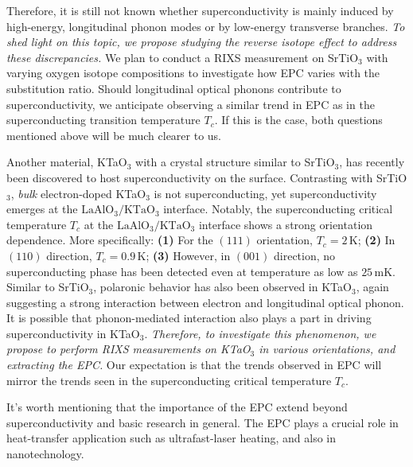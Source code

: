 \documentclass[11pt]{article}
\begin{document}
Therefore, it is still not known whether superconductivity is mainly induced by high-energy, longitudinal phonon modes or by low-energy transverse branches.
\textit{To shed light on this topic, we propose studying the reverse isotope effect to address these discrepancies.} We plan to conduct a RIXS measurement on SrTiO$_{3}$ with varying oxygen isotope compositions to investigate how EPC varies with the substitution ratio.  Should longitudinal optical phonons contribute to superconductivity, we anticipate observing a similar trend in EPC as in the superconducting transition temperature $T_{c}$. If this is the case, both questions mentioned above will be much clearer to us. 

Another material, KTaO$_{3}$ with a crystal structure similar to SrTiO$_{3}$, has recently been discovered to host superconductivity on the surface\cite{ren_two-dimensional_2022}. 
Contrasting with SrTiO$_{3}$, \textit{bulk}  electron-doped KTaO$_{3}$ is not superconducting, yet superconductivity emerges at the $\mathrm{LaAlO_{3}/KTaO_{3}}$ interface\cite{ren_two-dimensional_2022,chen_two-dimensional_2021}. 
Notably, the superconducting critical temperature $T_c$ at the $\mathrm{LaAlO_{3}/KTaO_{3}}$ interface shows a strong orientation dependence\cite{ren_two-dimensional_2022,chen_two-dimensional_2021}. 
More specifically: 
\textbf{(1)} For the $(111)$ orientation, $T_{c} = 2\,\mathrm{K}$\cite{ren_two-dimensional_2022};
\textbf{(2)} In $(110)$ direction, $T_{c} = 0.9\,\mathrm{K}$\cite{chen_two-dimensional_2021};
\textbf{(3)} However, in $(001)$ direction, no superconducting phase has been detected even at temperature as low as $25\,\mathrm{mK}$\cite{ren_two-dimensional_2022}. 
Similar to SrTiO$_{3}$\cite{swartz_polaronic_2018}, polaronic behavior has also been observed in KTaO$_{3}$, again suggesting a strong interaction between electron and longitudinal optical phonon\cite{chen_orientation-dependent_2023}. 
It is possible that phonon-mediated interaction also plays a part in driving superconductivity in KTaO$_{3}$. 
\textit{Therefore, to investigate this phenomenon, we propose to perform RIXS measurements on KTaO$_{3}$ in various orientations, and extracting the EPC.}
Our expectation is that the trends observed in EPC will mirror the trends seen in the superconducting critical temperature $T_c$. 

It's worth mentioning that the importance of the EPC extend beyond superconductivity and basic research in general.
The EPC plays a crucial role in heat-transfer application such as ultrafast-laser heating\cite{guo_heat_2012}, and also in nanotechnology\cite{zheng_dynamics_2018}.
\end{document}
